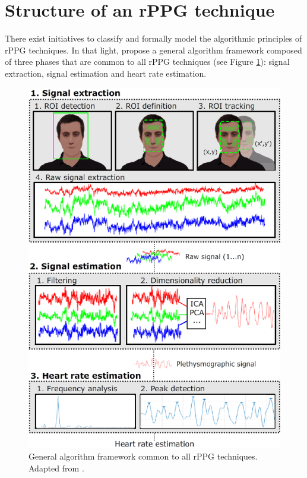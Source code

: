 \section{Structure of an rPPG technique}

There exist initiatives to classify \parencite{rouast2016remote, mcduff2015survey} and formally model the algorithmic principles \parencite{Wang_2016algorithmic} of rPPG techniques. In that light, \textcite{rouast2016remote} propose a general algorithm framework composed of three phases that are common to all rPPG techniques (see Figure \ref{fig:rppg}): signal extraction, signal estimation and heart rate estimation.

\begin{figure}
\centering
\includegraphics[width=0.9\linewidth]{figures/general-rppg}
\caption{General algorithm framework common to all rPPG techniques. Adapted from \textcite{rouast2016remote}.}
\label{fig:rppg}
\end{figure}

